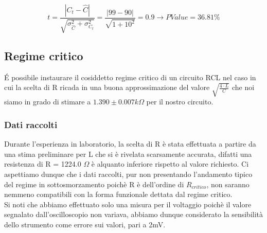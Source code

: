 \documentclass[a4paper]{article}
\theoremstyle{definition}
\begin{document}
\[t = \frac{\left|C_{t} - \hat{C} \right| }{\sqrt{\sigma^{2}_{\hat{C}} + \sigma^{2}_{C_{t}}}}=\frac{\left| 99 - 90\right|}{\sqrt{1 + 10^{2}}} = 0.9 \rightarrow PValue = 36.81\%\]


\pagebreak

\subsection{Regime critico}
É possibile instaurare il cosiddetto regime critico di un circuito RCL nel caso in cui la scelta di R ricada in una buona approssimazione del valore \(\sqrt{\frac{4\cdot L}{C}}\) che noi siamo in grado di stimare a \(1.390 \pm 0.007 k\Omega\) per il nostro circuito. 

\subsubsection*{Dati raccolti}
Durante l'esperienza in laboratorio, la scelta di R è stata effettuata a partire da una stima preliminare per L che si è rivelata scarsamente accurata, difatti una resistenza di R = 1224.0 \(\Omega\) è alquanto inferiore rispetto al valore richiesto. Ci aspettiamo dunque che i dati raccolti, pur non presentando l'andamento tipico del regime in sottosmorzamento poichè R è dell'ordine di \(R_{critico}\), non saranno nemmeno compatibili con la forma funzionale dettata dal regime critico.\\

\noindent Si noti che abbiamo effettuato solo una misura per il voltaggio poichè il valore segnalato dall'oscilloscopio non variava, abbiamo dunque considerato la sensibilità dello strumento come errore sui valori, pari a 2mV.
\end{document}
